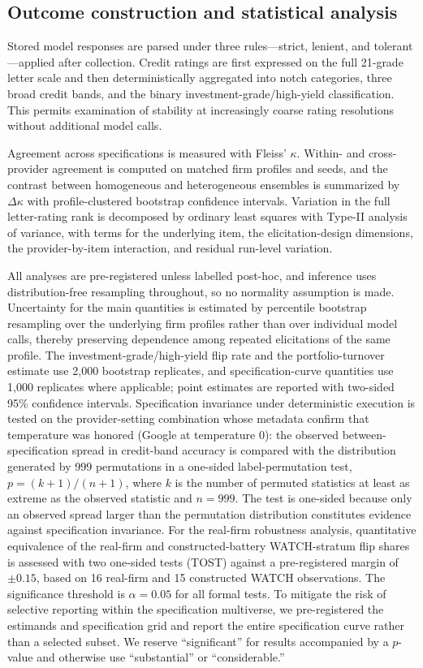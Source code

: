 \documentclass[pdflatex,sn-nature,lineno]{sn-jnl}
\theoremstyle{thmstyleone}
\begin{document}
\subsection{Outcome construction and statistical analysis}
Stored model responses are parsed under three rules---strict, lenient, and tolerant---applied after
collection. Credit ratings are first expressed on the full 21-grade letter scale and then deterministically
aggregated into notch categories, three broad credit bands, and the binary investment-grade/high-yield
classification. This permits examination of stability at increasingly coarse rating resolutions without
additional model calls.

Agreement across specifications is measured with Fleiss' $\kappa$. Within- and cross-provider agreement
is computed on matched firm profiles and seeds, and the contrast between homogeneous and heterogeneous
ensembles is summarized by $\Delta\kappa$ with profile-clustered bootstrap confidence intervals.
Variation in the full letter-rating rank is decomposed by ordinary least squares with Type-II analysis
of variance, with terms for the underlying item, the elicitation-design dimensions, the
provider-by-item interaction, and residual run-level variation.

All analyses are pre-registered unless labelled post-hoc, and inference uses distribution-free resampling
throughout, so no normality assumption is made. Uncertainty for the main quantities is estimated by
percentile bootstrap resampling over the underlying firm profiles rather than over individual model calls,
thereby preserving dependence among repeated elicitations of the same profile. The
investment-grade/high-yield flip rate and the portfolio-turnover estimate use 2{,}000 bootstrap
replicates, and specification-curve quantities use 1{,}000 replicates where applicable; point estimates
are reported with two-sided 95\% confidence intervals. Specification invariance under deterministic
execution is tested on the provider-setting combination whose metadata confirm that temperature was
honored (Google at temperature 0): the observed between-specification spread in credit-band accuracy is
compared with the distribution generated by 999 permutations in a one-sided label-permutation test,
$p=(k{+}1)/(n{+}1)$, where $k$ is the number of permuted statistics at least as extreme as the observed
statistic and $n=999$. The test is one-sided because only an observed spread larger than the permutation
distribution constitutes evidence against specification invariance. For the real-firm robustness
analysis, quantitative equivalence of the real-firm and constructed-battery WATCH-stratum flip shares is
assessed with two one-sided tests (TOST) against a pre-registered margin of $\pm0.15$, based on 16
real-firm and 15 constructed WATCH observations. The significance threshold is $\alpha=0.05$ for all
formal tests. To mitigate the risk of selective reporting within the specification multiverse, we
pre-registered the estimands and specification grid and report the entire specification curve rather than
a selected subset. We reserve ``significant'' for results accompanied by a $p$-value and otherwise use
``substantial'' or ``considerable.''
\end{document}
